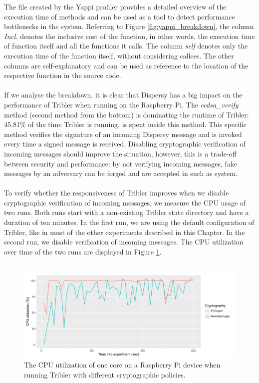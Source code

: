 The file created by the Yappi profiler provides a detailed overview of the execution time of methods and can be used as a tool to detect performance bottlenecks in the system. Referring to Figure \ref{fig:yappi_breakdown}, the column \emph{Incl.} denotes the inclusive cost of the function, in other words, the execution time of function itself and all the functions it calls. The column \emph{self} denotes only the execution time of the function itself, without considering callees. The other columns are self-explanatory and can be used as reference to the location of the respective function in the source code.\\\\
If we analyse the breakdown, it is clear that Dispersy has a big impact on the performance of Tribler when running on the Raspberry Pi. The \emph{ecdsa\_verify} method (second method from the bottom) is dominating the runtime of Tribler: 45.81\% of the time Tribler is running, is spent inside this method. This specific method verifies the signature of an incoming Dispersy message and is invoked every time a signed message is received. Disabling cryptographic verification of incoming messages should improve the situation, however, this is a trade-off between security and performance: by not verifying incoming messages, fake messages by an adversary can be forged and are accepted in such as system.\\\\
To verify whether the responsiveness of Tribler improves when we disable cryptographic verification of incoming messages, we measure the CPU usage of two runs. Both runs start with a non-existing Tribler state directory and have a duration of ten minutes. In the first run, we are using the default configuration of Tribler, like in most of the other experiments described in this Chapter. In the second run, we disable verification of incoming messages. The CPU utilization over time of the two runs are displayed in Figure \ref{fig:raspi_cpu_usage}.\\\\

\begin{figure}[!h]
	\centering
	\includegraphics[width=1.0\columnwidth]{images/experiments/raspi_cpu_usage}
	\caption{The CPU utilization of one core on a Raspberry Pi device when running Tribler with different cryptographic policies.}
	\label{fig:raspi_cpu_usage}
\end{figure}


